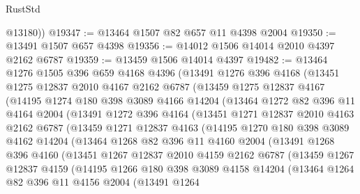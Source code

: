 \begin{lexlean}{RustStd}
\begin{coremodule}
        @13180))
@19347 := @13464 @1507 @82 @657 @11 @4398 @2004
@19350 := @13491 @1507 @657 @4398
@19356 := @14012 @1506 @14014 @2010 @4397 @2162 @6787
@19359 := @13459 @1506 @14014 @4397
@19482 := @13464
    @1276
    @1505
    @396
    @659
    @4168
    @4396
    (@13491
      @1276
      @396
      @4168
      (@13451
        @1275
        @12837
        @2010
        @4167
        @2162
        @6787
        (@13459
          @1275
          @12837
          @4167
          (@14195
            @1274
            @180
            @398
            @3089
            @4166
            @14204
            (@13464
              @1272
              @82
              @396
              @11
              @4164
              @2004
              (@13491
                @1272
                @396
                @4164
                (@13451
                  @1271
                  @12837
                  @2010
                  @4163
                  @2162
                  @6787
                  (@13459
                    @1271
                    @12837
                    @4163
                    (@14195
                      @1270
                      @180
                      @398
                      @3089
                      @4162
                      @14204
                      (@13464
                        @1268
                        @82
                        @396
                        @11
                        @4160
                        @2004
                        (@13491
                          @1268
                          @396
                          @4160
                          (@13451
                            @1267
                            @12837
                            @2010
                            @4159
                            @2162
                            @6787
                            (@13459
                              @1267
                              @12837
                              @4159
                              (@14195
                                @1266
                                @180
                                @398
                                @3089
                                @4158
                                @14204
                                (@13464
                                  @1264
                                  @82
                                  @396
                                  @11
                                  @4156
                                  @2004
                                  (@13491
                                    @1264

\end{coremodule}
\end{lexlean}
